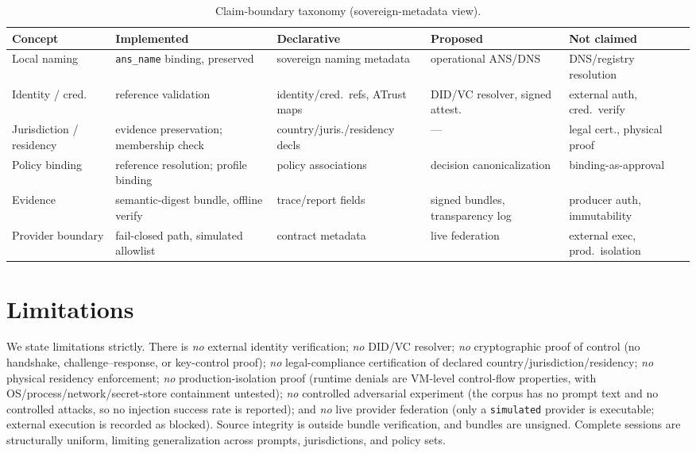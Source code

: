 \documentclass[conference]{IEEEtran}
\newcommand{\code}[1]{\texttt{\small #1}}
\begin{document}
\begin{table}[t]
\centering
\caption{Claim-boundary taxonomy (sovereign-metadata view).}
\label{tab:claim}
\renewcommand{\arraystretch}{1.25}
\footnotesize
\begin{tabular}{@{}p{}p{}p{}p{}p{}@{}}
\toprule
\textbf{Concept} & \textbf{Implemented} & \textbf{Declarative} & \textbf{Proposed} & \textbf{Not claimed} \\
\midrule
Local naming & \code{ans\_name} binding, preserved & sovereign naming metadata & operational ANS/DNS & DNS/registry resolution \\
Identity / cred. & reference validation & identity/cred.\ refs, ATrust maps & DID/VC resolver, signed attest. & external auth, cred.\ verify \\
Jurisdiction / residency & evidence preservation; membership check & country/juris./residency decls & --- & legal cert., physical proof \\
Policy binding & reference resolution; profile binding & policy associations & decision canonicalization & binding-as-approval \\
Evidence & semantic-digest bundle, offline verify & trace/report fields & signed bundles, transparency log & producer auth, immutability \\
Provider boundary & fail-closed path, simulated allowlist & contract metadata & live federation & external exec, prod.\ isolation \\
\bottomrule
\end{tabular}
\end{table}

\section{Limitations}\label{sec:limits}
We state limitations strictly. There is \emph{no} external identity verification;
\emph{no} DID/VC resolver; \emph{no} cryptographic proof of control (no
handshake, challenge--response, or key-control proof); \emph{no} legal-compliance
certification of declared country/jurisdiction/residency; \emph{no} physical
residency enforcement; \emph{no} production-isolation proof (runtime denials are
VM-level control-flow properties, with OS/process/network/secret-store
containment untested); \emph{no} controlled adversarial experiment (the corpus
has no prompt text and no controlled attacks, so no injection success rate is
reported); and \emph{no} live provider federation (only a \code{simulated}
provider is executable; external execution is recorded as blocked). Source
integrity is outside bundle verification, and bundles are unsigned. Complete
sessions are structurally uniform, limiting generalization across prompts,
jurisdictions, and policy sets.
\end{document}
